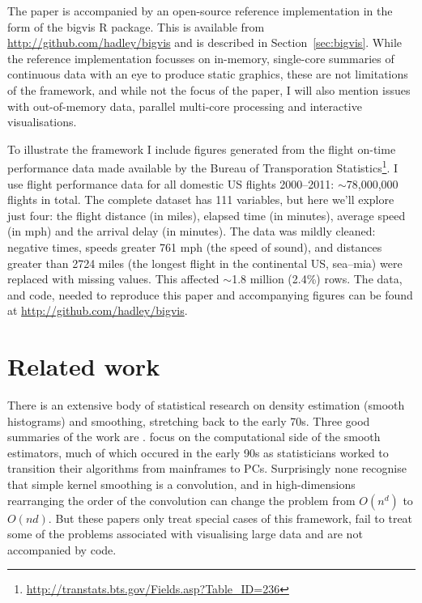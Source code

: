 \documentclass[journal]{vgtc}                %
\begin{document}
The paper is accompanied by an open-source reference implementation in the form of the bigvis R \citep{R} package. This is available from \url{http://github.com/hadley/bigvis} and is described in Section~\ref{sec:bigvis}. While the reference implementation focusses on in-memory, single-core summaries of continuous data with an eye to produce static graphics, these are not limitations of the framework, and while not the focus of the paper, I will also mention issues with out-of-memory data, parallel multi-core processing and interactive visualisations. 

To illustrate the framework I include figures generated from the flight on-time performance data made available by the Bureau of Transporation Statistics\footnote{\url{http://transtats.bts.gov/Fields.asp?Table_ID=236}}. I use flight performance data for all domestic US flights 2000--2011: $\sim$78,000,000 flights in total. The complete dataset has 111 variables, but here we'll explore just four: the flight distance (in miles), elapsed time (in minutes), average speed (in mph) and the arrival delay (in minutes). The data was mildly cleaned: negative times, speeds greater 761 mph (the speed of sound), and distances greater than 2724 miles (the longest flight in the continental US, {\sc sea}--{\sc mia}) were replaced with missing values. This affected $\sim$1.8 million (2.4\%) rows. The data, and code, needed to reproduce this paper and accompanying figures can be found at \url{http://github.com/hadley/bigvis}.

\section{Related work}
\label{sec:related-work}

There is an extensive body of statistical research on density estimation (smooth histograms) and smoothing, stretching back to the early 70s. Three good summaries of the work are \cite{scott:1992,bowman:1997,loader:1999a}.    \cite{hardle:1992,wand:1994,fan:1994} focus on the computational side of the smooth estimators, much of which occured in the early 90s as statisticians worked to transition their algorithms from mainframes to PCs.  Surprisingly none recognise that simple kernel smoothing is a convolution, and in high-dimensions rearranging the order of the convolution can change the problem from $O(n^d)$ to $O(nd)$. But these papers only treat special cases of this framework, fail to treat some of the problems associated with visualising large data and are not accompanied by code.
\end{document}
